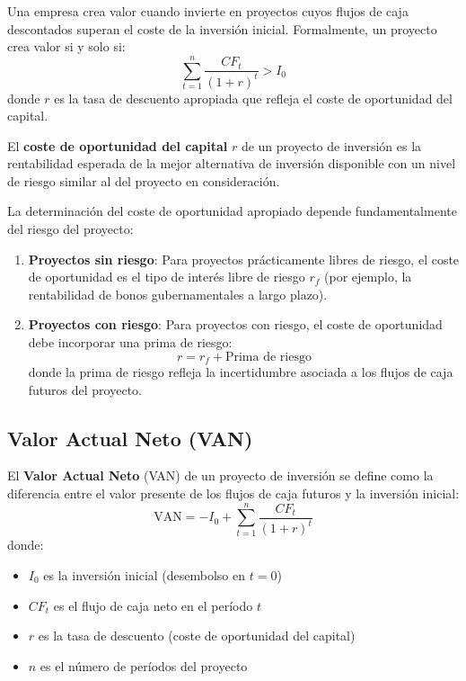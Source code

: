 \begin{teorema}
Una empresa crea valor cuando invierte en proyectos cuyos flujos de caja descontados superan el coste de la inversión inicial. Formalmente, un proyecto crea valor si y solo si:
\begin{equation}
\sum_{t=1}^{n} \frac{CF_t}{(1+r)^t} > I_0
\end{equation}
donde $r$ es la tasa de descuento apropiada que refleja el coste de oportunidad del capital.
\end{teorema}

\begin{definicion}
El \textbf{coste de oportunidad del capital} $r$ de un proyecto de inversión es la rentabilidad esperada de la mejor alternativa de inversión disponible con un nivel de riesgo similar al del proyecto en consideración.
\end{definicion}

La determinación del coste de oportunidad apropiado depende fundamentalmente del riesgo del proyecto:

\begin{enumerate}
\item \textbf{Proyectos sin riesgo}: Para proyectos prácticamente libres de riesgo, el coste de oportunidad es el tipo de interés libre de riesgo $r_f$ (por ejemplo, la rentabilidad de bonos gubernamentales a largo plazo).

\item \textbf{Proyectos con riesgo}: Para proyectos con riesgo, el coste de oportunidad debe incorporar una prima de riesgo:
\begin{equation}
r = r_f + \text{Prima de riesgo}
\end{equation}
donde la prima de riesgo refleja la incertidumbre asociada a los flujos de caja futuros del proyecto.
\end{enumerate}

\subsection{Valor Actual Neto (VAN)}

\begin{definicion}
El \textbf{Valor Actual Neto} (VAN) de un proyecto de inversión se define como la diferencia entre el valor presente de los flujos de caja futuros y la inversión inicial:
\begin{equation}
\text{VAN} = -I_0 + \sum_{t=1}^{n} \frac{CF_t}{(1+r)^t}
\end{equation}
donde:
\begin{itemize}
\item $I_0$ es la inversión inicial (desembolso en $t=0$)
\item $CF_t$ es el flujo de caja neto en el período $t$
\item $r$ es la tasa de descuento (coste de oportunidad del capital)
\item $n$ es el número de períodos del proyecto
\end{itemize}
\end{definicion}

